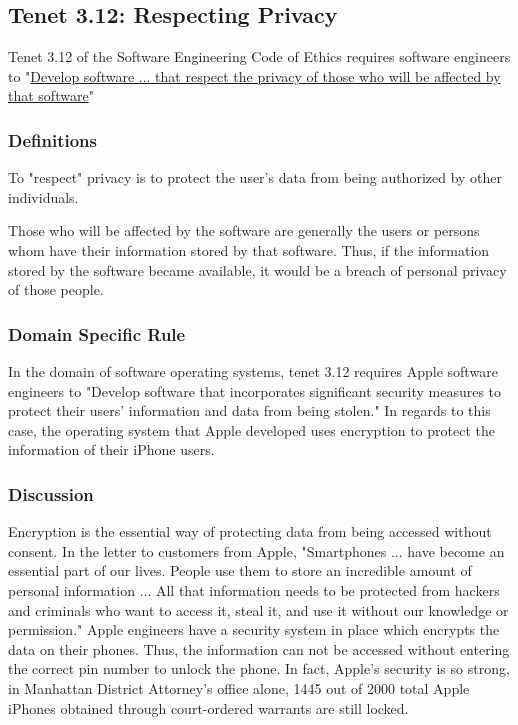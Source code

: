 \subsection{Tenet 3.12: Respecting Privacy}
Tenet 3.12 of the Software Engineering Code of Ethics requires software engineers to "\uline{Develop software ... that respect the privacy of those who will be affected by that software}" \cite{code}
\
\subsubsection{Definitions}
To "respect" privacy is to protect the user's data from being authorized by other individuals. \cite{india}
\subsubsubsection{Actual or Potential Danger}

Those who will be affected by the software are generally the users or persons whom have their information stored by that software. Thus, if the information stored by the software became available, it would be a breach of personal privacy of those people.

\subsubsection{Domain Specific Rule}
In the domain of software operating systems, tenet 3.12 requires Apple software engineers to "Develop software that incorporates significant security measures to protect their users' information and data from being stolen." In regards to this case, the operating system that Apple developed uses encryption to protect the information of their iPhone users. 


\subsubsection{Discussion}

Encryption is the essential way of protecting data from being accessed without consent. In the letter to customers from Apple, "Smartphones ... have become an essential part of our lives. People use them to store an incredible amount of personal information ... All that information needs to be protected from hackers and criminals who want to access it, steal it, and use it without our knowledge or permission." \cite{appleletter} Apple engineers have a security system in place which encrypts the data on their phones. Thus, the information can not be accessed without entering the correct pin number to unlock the phone. In fact, Apple's security is so strong, in Manhattan District Attorney's office alone, 1445 out of 2000 total Apple iPhones obtained through court-ordered warrants are still locked. \cite{Manhattanda}\par


